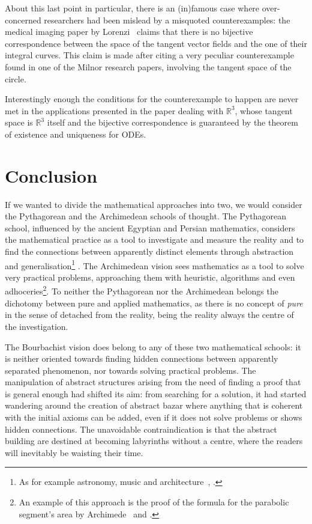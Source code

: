 \documentclass[]{scrartcl}
\theoremstyle{definition}
\begin{document}
\begin{itemize}
\end{itemize}

About this last point in particular, there is an (in)famous case where over-concerned researchers had been mislead by a misquoted counterexamples: the medical imaging paper by Lorenzi~\cite{lorenzi2013geodesics} claims that there is no bijective correspondence between the space of the tangent vector fields and the one of their integral curves. This claim is made after citing a very peculiar counterexample found in one of the Milnor research papers, involving the tangent space of the circle.

Interestingly enough the conditions for the counterexample to happen are never met in the applications presented in the paper dealing with $\mathbb{R}^3$, whose tangent space is $\mathbb{R}^3$ itself and the bijective correspondence is guaranteed by the theorem of existence and uniqueness for ODEs.


\section{Conclusion}

If we wanted to divide the mathematical approaches into two, we would consider the Pythagorean and the Archimedean schools of thought. The Pythagorean school, influenced by the ancient Egyptian and Persian mathematics, considers the mathematical practice as a tool to investigate and measure the reality and to find the connections between apparently distinct elements through abstraction and generalisation\footnote{
    As for example astronomy, music and architecture~\cite{robins1995mathematics}, \cite{boyer2011history}.
}
. The Archimedean vision sees mathematics as a tool to solve very practical problems, approaching them with heuristic, algorithms and even adhoceries\footnote{
    An example of this approach is the proof of the formula for the parabolic segment's area by Archimede~\cite{boyer2011history} and \cite{strogatz2019infinite}.
}. To neither the Pythagorean nor the Archimedean belongs the dichotomy between pure and applied mathematics, as there is no concept of \emph{pure} in the sense of detached from the reality, being the reality always the centre of the investigation.

The Bourbachist vision does belong to any of these two mathematical schools: it is neither oriented towards finding hidden connections between apparently separated phenomenon, nor towards solving practical problems. The manipulation of abstract structures arising from the need of finding a proof that is general enough had shifted its aim: from searching for a solution, it had started wandering around the creation of abstract bazar where anything that is coherent with the initial axioms can be added, even if it does not solve problems or shows hidden connections. The unavoidable contraindication is that the abstract building are destined at becoming labyrinths without a centre, where the readers will inevitably be waisting their time.
\end{document}
